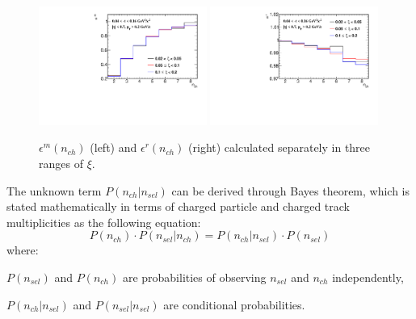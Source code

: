 \begin{figure}[h!]
	\centering
	\includegraphics[width=0.49\textwidth,page=1]{chapters/chrgSTAR/img/unfolding/correction_0.pdf}
	\includegraphics[width=0.49\textwidth,page=1]{chapters/chrgSTAR/img/unfolding/correction_1.pdf}
	\caption[$\epsilon^{m}(n_{ch})$ and $\epsilon^{r}(n_{ch})$ in three ranges of $\xi$]{$\epsilon^{m}(n_{ch})$ (left)  and $\epsilon^{r}(n_{ch})$ (right) calculated separately in three ranges of $\xi$.}
	\label{fig:correctionSTAR}
\end{figure}

The unknown term $P(n_{ch}|n_{sel})$ can be derived through Bayes theorem, which is stated mathematically in terms of charged particle and charged track multiplicities as the following equation:
\begin{equation}
P\left(n_{ch}\right)\cdot P\left(n_{sel}|n_{ch}\right) = P\left(n_{ch}|n_{sel}\right)\cdot P\left(n_{sel}\right)
\end{equation}
where:
\begin{description}
	\item $P(n_{sel})$ and $P(n_{ch})$ are probabilities of observing $n_{sel}$ and $n_{ch}$ independently,
	\item $P(n_{ch}|n_{sel})$ and $P(n_{sel}|n_{sel})$ are conditional probabilities.
\end{description}
 
